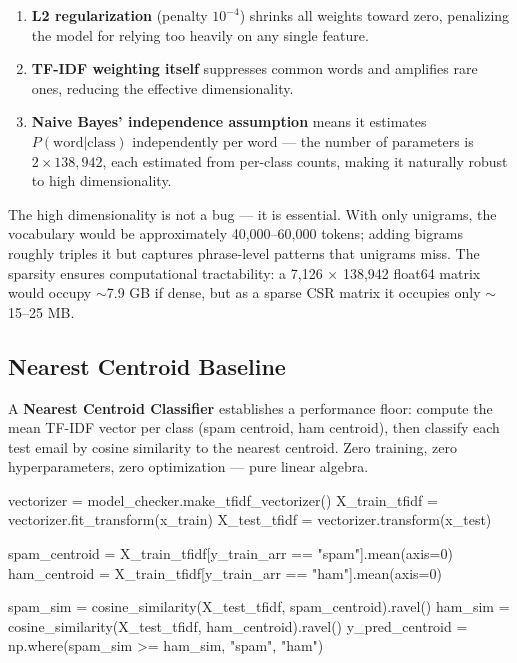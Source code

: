 \begin{enumerate}
  \item \textbf{L2 regularization} (penalty $10^{-4}$) shrinks all weights toward zero, penalizing the model for relying too heavily on any single feature.
  \item \textbf{TF-IDF weighting itself} suppresses common words and amplifies rare ones, reducing the effective dimensionality.
  \item \textbf{Naive Bayes' independence assumption} means it estimates $P(\text{word}|\text{class})$ independently per word — the number of parameters is $2 \times 138,942$, each estimated from per-class counts, making it naturally robust to high dimensionality.
\end{enumerate}

The high dimensionality is not a bug — it is essential. With only unigrams, the vocabulary would be approximately 40,000--60,000 tokens; adding bigrams roughly triples it but captures phrase-level patterns that unigrams miss. The sparsity ensures computational tractability: a 7,126 $\times$ 138,942 float64 matrix would occupy $\sim$7.9 GB if dense, but as a sparse CSR matrix it occupies only $\sim$15--25 MB.

\subsection{Nearest Centroid Baseline}

A \textbf{Nearest Centroid Classifier} establishes a performance floor: compute the mean TF-IDF vector per class (spam centroid, ham centroid), then classify each test email by cosine similarity to the nearest centroid. Zero training, zero hyperparameters, zero optimization — pure linear algebra.

\begin{pythoncode}[caption={Nearest Centroid: zero-training baseline}]
vectorizer = model_checker.make_tfidf_vectorizer()
X_train_tfidf = vectorizer.fit_transform(x_train)
X_test_tfidf = vectorizer.transform(x_test)

spam_centroid = X_train_tfidf[y_train_arr == "spam"].mean(axis=0)
ham_centroid  = X_train_tfidf[y_train_arr == "ham"].mean(axis=0)

spam_sim = cosine_similarity(X_test_tfidf, spam_centroid).ravel()
ham_sim  = cosine_similarity(X_test_tfidf, ham_centroid).ravel()
y_pred_centroid = np.where(spam_sim >= ham_sim, "spam", "ham")
\end{pythoncode}

